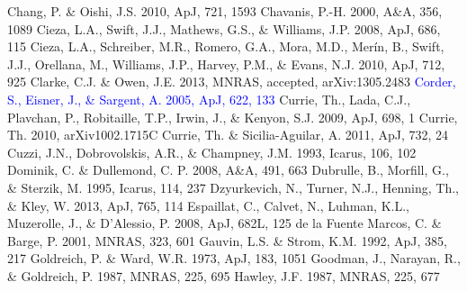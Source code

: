 \documentclass[apj]{emulateapj}
\def\blue#1{\textcolor{blue}{#1}}
\begin{document}
\begin{thebibliography}{}
 Chang, P. \& Oishi, J.S. 2010, ApJ, 721, 1593
 Chavanis, P.-H. 2000, A\&A, 356, 1089
 Cieza, L.A., Swift, J.J., Mathews, G.S., \& Williams, J.P. 2008, ApJ, 686, 115
 Cieza, L.A., Schreiber, M.R., Romero, G.A., Mora, M.D., Mer\'in, B., Swift, J.J., Orellana, M., Williams, J.P., Harvey, P.M., \& Evans, N.J. 2010, ApJ, 712, 925
 Clarke, C.J. \& Owen, J.E. 2013, MNRAS, accepted, arXiv:1305.2483
\bibitem[{{\blue{Corder et al.}}(2005)}]{Corder05} \blue{Corder, S., Eisner, J., \& Sargent, A. 2005, ApJ, 622, 133}
 Currie, Th., Lada, C.J., Plavchan, P.,  Robitaille, T.P., Irwin, J., \& Kenyon, S.J. 2009, ApJ, 698, 1
 Currie, Th. 2010, arXiv1002.1715C	
 Currie, Th. \& Sicilia-Aguilar, A. 2011, ApJ, 732, 24
 Cuzzi, J.N., Dobrovolskis, A.R., \& Champney, J.M. 1993, Icarus, 106, 102
 Dominik, C. \& Dullemond, C. P. 2008, A\&A, 491, 663
 Dubrulle, B., Morfill, G., \& Sterzik, M. 1995, Icarus, 114, 237
 Dzyurkevich, N., Turner, N.J., Henning, Th., \& Kley, W. 2013, ApJ, 765, 114
 Espaillat, C., Calvet, N., Luhman, K.L., Muzerolle, J., \& D'Alessio, P. 2008, ApJ, 682L, 125
 de la Fuente Marcos, C. \& Barge, P. 2001, MNRAS, 323, 601 
 Gauvin, L.S. \& Strom, K.M. 1992, ApJ, 385, 217
 Goldreich, P. \& Ward, W.R. 1973, ApJ, 183, 1051
 Goodman, J., Narayan, R., \& Goldreich, P. 1987, MNRAS, 225, 695
 Hawley, J.F. 1987, MNRAS, 225, 677

\end{thebibliography}
\end{document}
